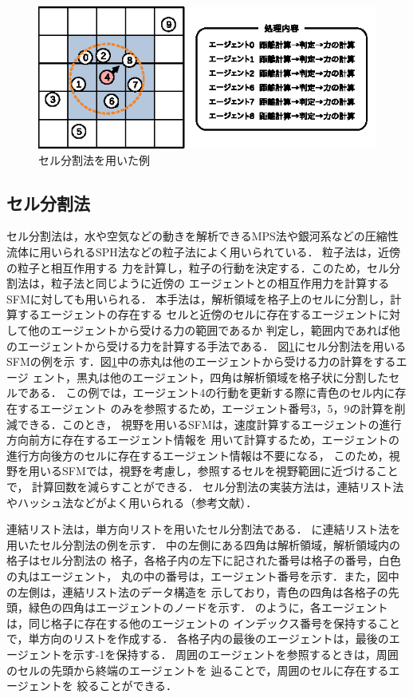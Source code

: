 \begin{figure}[t]
 \begin{center}
  \includegraphics[width=11.5cm,clip]{figure/serubunkatu_ex1.eps}
  \caption{セル分割法を用いた例}
  \label{fig:seru_ex1}
 \end{center}
\end{figure}


\subsection{セル分割法}
セル分割法は，水や空気などの動きを解析できるMPS法\cite{mps}や銀河系などの圧縮性
流体に用いられるSPH法\cite{sph}などの粒子法によく用いられている．
粒子法は，近傍の粒子と相互作用する
力を計算し，粒子の行動を決定する．このため，セル分割法は，粒子法と同じように近傍の
エージェントとの相互作用力を計算するSFMに対しても用いられる．
本手法は，解析領域を格子上のセルに分割し，計算するエージェントの存在する
セルと近傍のセルに存在するエージェントに対して他のエージェントから受ける力の範囲であるか
判定し，範囲内であれば他のエージェントから受ける力を計算する手法である．
図\ref{fig:seru_ex1}にセル分割法を用いるSFMの例を示
す．図\ref{fig:seru_ex1}中の赤丸は他のエージェントから受ける力の計算をするエージ
ェント，黒丸は他のエージェント，四角は解析領域を格子状に分割したセルである．
この例では，エージェント4の行動を更新する際に青色のセル内に存在するエージェント
のみを参照するため，エージェント番号3，5，9の計算を削減できる．このとき，
視野を用いるSFMは，速度計算するエージェントの進行方向前方に存在するエージェント情報を
用いて計算するため，エージェントの進行方向後方のセルに存在するエージェント情報は不要になる，
このため，視野を用いるSFMでは，視野を考慮し，参照するセルを視野範囲に近づけることで，
計算回数を減らすことができる．
セル分割法の実装方法は，連結リスト法やハッシュ法などがよく用いられる（参考文献）．

連結リスト法は，単方向リストを用いたセル分割法である．
に連結リスト法を用いたセル分割法の例を示す．
中の左側にある四角は解析領域，解析領域内の格子はセル分割法の
格子，各格子内の左下に記された番号は格子の番号，白色の丸はエージェント，
丸の中の番号は，エージェント番号を示す．また，図中の左側は，連結リスト法のデータ構造を
示しており，青色の四角は各格子の先頭，緑色の四角はエージェントのノードを示す．
のように，各エージェントは，同じ格子に存在する他のエージェントの
インデックス番号を保持することで，単方向のリストを作成する．
各格子内の最後のエージェントは，最後のエージェントを示す-1を保持する．
周囲のエージェントを参照するときは，周囲のセルの先頭から終端のエージェントを
辿ることで，周囲のセルに存在するエージェントを
絞ることができる．


